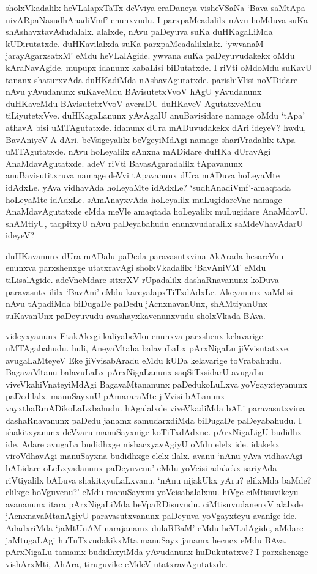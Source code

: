 sholxVkadalilx heVLalapxTaTx deVviya eraDaneya visheVSaNa `Bava saMtApa nivARpaNasudhAnadiVmf' enunxvudu. I parxpaMcadalilx 
nAvu hoMduva suKa shAshavxtavAdudalalx. alalxde, nAvu paDeyuva suKa duHKagaLiMda kUDirutatxde. duHKavilalxda 
suKa parxpaMcadalilxlalx. `ywvanaM jarayAgarxsatxM' eMdu heVLalAgide. ywvana suKa paDeyuvudakekx oMdu 
kAraNavAgide. mupupx idanunx kabaLisi biDutatxde. I riVti oMdoMdu suKavU tananx shaturxvAda duHKadiMda 
nAshavAgutatxde. parishiVlisi noVDidare nAvu yAvudanunx suKaveMdu BAvisutetxVvoV 
hAgU yAvudanunx duHKaveMdu BAvisutetxVvoV averaDU duHKaveV AgutatxveMdu tiLiyutetxVve. duHKagaLanunx 
yAvAgalU anuBavisidare namage oMdu `tApa' athavA bisi uMTAgutatxde. idanunx dUra 
mADuvudakekx dAri ideyeV? hwdu, BavAniyeV A dAri. beVsigeyalilx beVgeyiMdAgi 
namage shariVradalilx tApa uMTAgutatxde. nAvu hoLeyalilx sAnxna mADidare duHKa dUravAgi 
AnaMdavAgutatxde. adeV riVti BavasAgaradalilx tApavanunx anuBavisutitxruva namage deVvi 
tApavanunx dUra mADuva hoLeyaMte idAdxLe. yAva vidhavAda hoLeyaMte idAdxLe? 
`sudhAnadiVmf'-amaqtada hoLeyaMte idAdxLe. sAmAnayxvAda hoLeyalilx muLugidareVne 
namage AnaMdavAgutatxde eMda meVle amaqtada hoLeyalilx muLugidare AnaMdavU, shAMtiyU, 
taqpitxyU nAvu paDeyabahudu enunxvudaralilx saMdeVhavAdarU ideyeV?

duHKavanunx dUra mADalu paDeda paravasutxvina AkArada hesareVnu enunxva parxshenxge utatxravAgi sholxVkadalilx 
`BavAniVM' eMdu tiLisalAgide. adeVneMdare sitxrXV rUpadalilx dashaRnavanunx koDuva paravasutx ililx `BavAni' eMdu 
kareyalapxTiTxdAdxLe. 
Akeyanunx vaMdisi nAvu tApadiMda biDugaDe paDedu jAcnxnavanUnx, shAMtiyanUnx suKavanUnx paDeyuvudu avashayxkavenunxvudu sholxVkada BAva.

videyxyanunx EtakAkxgi kaliyabeVku enunxva parxshenx kelavarige uMTAga\-bahudu. huli, AneyaMtaha balavuLaLx pArxNigaLu jiVvisutatxve. avugaLaMteyeV 
Eke jiVvisabAradu eMdu kUDa kelavarige toVrabahudu. BagavaMtanu balavuLaLx pArxNigaLanunx saqSiTxsidarU avugaLu viveVkahiVnateyiMdAgi 
BagavaMtananunx paDedukoLuLxva yoVgayxteyanunx paDedilalx. manuSayxnU pAmararaMte jiVvisi bALanunx vayxthaRmADikoLaLxbahudu. 
hAgalalxde viveVkadiMda bALi paravasutxvina dashaRnavanunx paDedu janamx samudarxdiMda biDugaDe paDeyabahudu. I shakitxyanunx deVvaru 
manuSayxnige koTiTxdAdxne. pArxNigaLigU budidhx ide. Adare avugaLa budidhxge nishacxyavAgiyU oMdu elelx ide. idakekx viroVdhavAgi 
manuSayxna budidhxge elelx ilalx. avanu `nAnu yAva vidhavAgi bALidare oLeLxyadanunx paDeyuvenu' eMdu yoVcisi adakekx sariyAda 
riVtiyalilx bALuva shakitxyuLaLxvanu. `nAnu nijakUkx yAru? elilxMda baMde? elilxge hoVguvenu?' eMdu manuSayxnu yoVcisabalalxnu. 
hiVge ciMtisuvikeyu avananunx itara pArxNigaLiMda beVpaRDisuvudu. ciMtisuvudanenxV alalxde jAcnxnavaMtanAgiyU paravasutxvanunx paDeyuva 
yoVgayxteyu avanige ide. AdadxriMda `jaMtUnAM narajanamx dulaRBaM' eMdu heVLalAgide, aMdare jaMtugaLAgi huTuTxvudakikxMta manuSayx 
janamx hecucx eMdu BAva. pArxNigaLu tamamx budidhxyiMda yAvudanunx huDukutatxve? I parxshenxge vishArxMti, AhAra, tiruguvike eMdeV utatxravAgutatxde.

